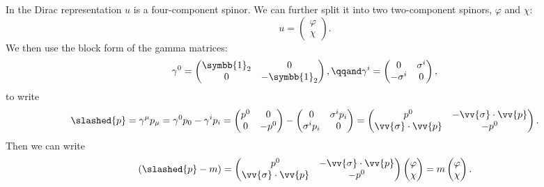 \documentclass[fleqn]{NotesClass}
\newcommand{\ident}{\symbb{1}}
\begin{document}
    In the Dirac representation \(u\) is a four-component spinor.
    We can further split it into two two-component spinors, \(\varphi\) and \(\chi\):
    \begin{equation}
        u = 
        \begin{pmatrix}
            \varphi\\ \chi
        \end{pmatrix}
        .
    \end{equation}
    We then use the block form of the gamma matrices:
    \begin{equation}
        \gamma^0 = 
        \begin{pmatrix}
            \ident_2 & 0\\
            0 & -\ident_2
        \end{pmatrix}
        , \qqand \gamma^i = 
        \begin{pmatrix}
            0 & \sigma^i\\
            -\sigma^i & 0
        \end{pmatrix}
        ,
    \end{equation}
    to write
    \begin{equation}
        \slashed{p} = \gamma^\mu p_\mu = \gamma^0 p_0 - \gamma^i p_i = 
        \begin{pmatrix}
            p^0 & 0\\
            0 & -p^0
        \end{pmatrix}
        -
        \begin{pmatrix}
            0 & \sigma^i p_i\\
            \sigma^i p_i & 0
        \end{pmatrix}
        =
        \begin{pmatrix}
            p^0 & -\vv{\sigma} \cdot \vv{p}\\
            \vv{\sigma} \cdot \vv{p} & -p^0
        \end{pmatrix}
        .
    \end{equation}
    Then we can write
    \begin{equation}
        (\slashed{p} - m) = 
        \begin{pmatrix}
            p^0 & -\vv{\sigma} \cdot \vv{p}\\
            \vv{\sigma} \cdot \vv{p} & -p^0
        \end{pmatrix}
        \begin{pmatrix}
            \varphi\\ \chi
        \end{pmatrix}
        = m
        \begin{pmatrix}
            \varphi\\ \chi
        \end{pmatrix}
        .
    \end{equation}
    
\end{document}
